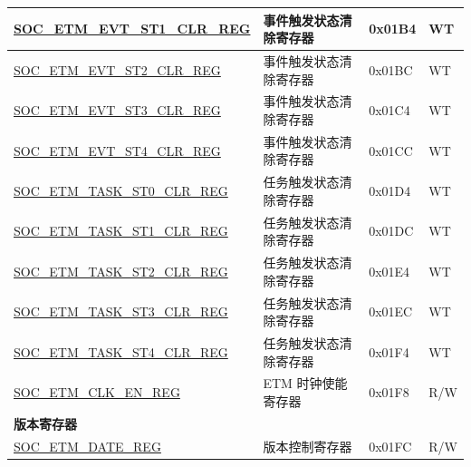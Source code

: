 \begin{longtable}{ | p{6cm} | p{6.2cm} | p{1.3cm} | p{2cm} | }
\hyperref[regdesc:SOCETMEVTST1CLRREG]{SOC\_ETM\_EVT\_ST1\_CLR\_REG} & 事件触发状态清除寄存器 & 0x01B4 & WT \\ \hline
\hyperref[regdesc:SOCETMEVTST2CLRREG]{SOC\_ETM\_EVT\_ST2\_CLR\_REG} & 事件触发状态清除寄存器 & 0x01BC & WT \\ \hline
\hyperref[regdesc:SOCETMEVTST3CLRREG]{SOC\_ETM\_EVT\_ST3\_CLR\_REG} & 事件触发状态清除寄存器 & 0x01C4 & WT \\ \hline
\hyperref[regdesc:SOCETMEVTST4CLRREG]{SOC\_ETM\_EVT\_ST4\_CLR\_REG} & 事件触发状态清除寄存器 & 0x01CC & WT \\ \hline
\hyperref[regdesc:SOCETMTASKST0CLRREG]{SOC\_ETM\_TASK\_ST0\_CLR\_REG} & 任务触发状态清除寄存器 & 0x01D4 & WT \\ \hline
\hyperref[regdesc:SOCETMTASKST1CLRREG]{SOC\_ETM\_TASK\_ST1\_CLR\_REG} & 任务触发状态清除寄存器 & 0x01DC & WT \\ \hline
\hyperref[regdesc:SOCETMTASKST2CLRREG]{SOC\_ETM\_TASK\_ST2\_CLR\_REG} & 任务触发状态清除寄存器 & 0x01E4 & WT \\ \hline
\hyperref[regdesc:SOCETMTASKST3CLRREG]{SOC\_ETM\_TASK\_ST3\_CLR\_REG} & 任务触发状态清除寄存器 & 0x01EC & WT \\ \hline
\hyperref[regdesc:SOCETMTASKST4CLRREG]{SOC\_ETM\_TASK\_ST4\_CLR\_REG} & 任务触发状态清除寄存器 & 0x01F4 & WT \\ \hline
\hyperref[regdesc:SOCETMCLKENREG]{SOC\_ETM\_CLK\_EN\_REG} & ETM 时钟使能寄存器 & 0x01F8 & R/W \\ \hline
\multicolumn{4}{|l|}{\textbf{版本寄存器}} \\ \hline
\hyperref[regdesc:SOCETMDATEREG]{SOC\_ETM\_DATE\_REG} & 版本控制寄存器 & 0x01FC & R/W \\ \hline
\end{longtable}
